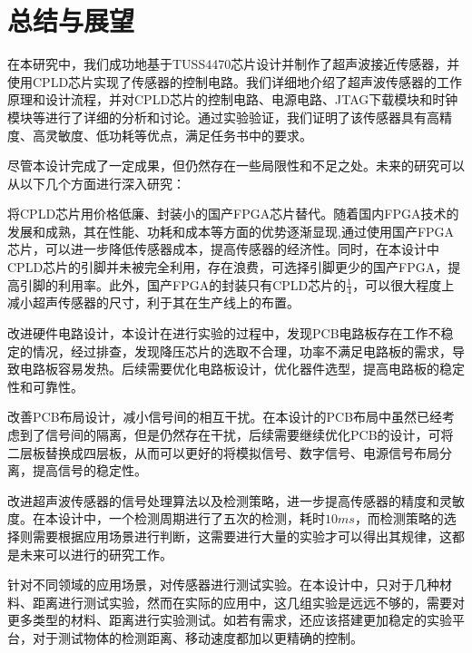 \newpage
\section{总结与展望}
在本研究中，我们成功地基于TUSS4470芯片设计并制作了超声波接近传感器，并使用CPLD芯片实现了传感器的控制电路。我们详细地介绍了超声波传感器的工作原理和设计流程，并对CPLD芯片的控制电路、电源电路、JTAG下载模块和时钟模块等进行了详细的分析和讨论。通过实验验证，我们证明了该传感器具有高精度、高灵敏度、低功耗等优点，满足任务书中的要求。\par
尽管本设计完成了一定成果，但仍然存在一些局限性和不足之处。未来的研究可以从以下几个方面进行深入研究：\par
将CPLD芯片用价格低廉、封装小的国产FPGA芯片替代。随着国内FPGA技术的发展和成熟，其在性能、功耗和成本等方面的优势逐渐显现,通过使用国产FPGA芯片，可以进一步降低传感器成本，提高传感器的经济性。同时，在本设计中CPLD芯片的引脚并未被完全利用，存在浪费，可选择引脚更少的国产FPGA，提高引脚的利用率。此外，国产FPGA的封装只有CPLD芯片的$\frac{1}{4}$，可以很大程度上减小超声传感器的尺寸，利于其在生产线上的布置。\par
改进硬件电路设计，本设计在进行实验的过程中，发现PCB电路板存在工作不稳定的情况，经过排查，发现降压芯片的选取不合理，功率不满足电路板的需求，导致电路板容易发热。后续需要优化电路板设计，优化器件选型，提高电路板的稳定性和可靠性。\par
改善PCB布局设计，减小信号间的相互干扰。在本设计的PCB布局中虽然已经考虑到了信号间的隔离，但是仍然存在干扰，后续需要继续优化PCB的设计，可将二层板替换成四层板，从而可以更好的将模拟信号、数字信号、电源信号布局分离，提高信号的稳定性。\par
改进超声波传感器的信号处理算法以及检测策略，进一步提高传感器的精度和灵敏度。在本设计中，一个检测周期进行了五次的检测，耗时$10ms$，而检测策略的选择则需要根据应用场景进行判断，这需要进行大量的实验才可以得出其规律，这都是未来可以进行的研究工作。\par
针对不同领域的应用场景，对传感器进行测试实验。在本设计中，只对于几种材料、距离进行测试实验，然而在实际的应用中，这几组实验是远远不够的，需要对更多类型的材料、距离进行实验测试。如若有需求，还应该搭建更加稳定的实验平台，对于测试物体的检测距离、移动速度都加以更精确的控制。\par


